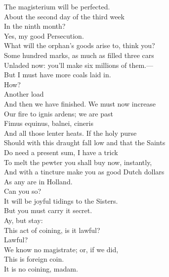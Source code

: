 \documentclass[a4paper,oneside,12pt]{memoir}
\begin{document}
\begin{drama*}
The magisterium will be perfected.\\
\persecutionspeaks About the second day of the third week\\
In the ninth month?\\
\subtlespeaks {} Yes, my good Persecution.\\
\tribulationspeaks What will the orphan's goods arise to, think you?\\
\subtlespeaks Some hundred marks, as much as filled three cars\\
Unladed now: you'll make six millions of them.---\\
But I must have more coals laid in.\\
\tribulationspeaks {} How?\\
\subtlespeaks {} Another load\\
And then we have finished. We must now increase\\
Our fire to ignis ardens; we are past\\
Fimus equinus, balnei, cineris\\
And all those lenter heats. If the holy purse\\
Should with this draught fall low and that the Saints\\
Do need a present sum, I have a trick\\
To melt the pewter you shall buy now, instantly,\\
And with a tincture make you as good Dutch dollars\\
As any are in Holland.\\
\tribulationspeaks {} Can you so?\\
\persecutionspeaks It will be joyful tidings to the Sisters.\\
\subtlespeaks But you must carry it secret.\\
\tribulationspeaks {} Ay, but stay:\\
This act of coining, is it lawful?\\
\persecutionspeaks {} Lawful?\\
We know no magistrate; or, if we did,\\
This is foreign coin.\\
\subtlespeaks {} It is no coining, madam.\\

\end{drama*}
\end{document}
